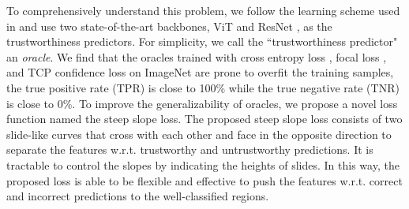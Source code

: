 
To comprehensively understand this problem, we follow the learning scheme used in \cite{Corbiere_NIPS_2019} and use two state-of-the-art backbones, \ie ViT \cite{Dosovitskiy_ICLR_2021} and ResNet \cite{He_CVPR_2016}, as the trustworthiness predictors.
For simplicity, we call the ``trustworthiness predictor" an \emph{oracle}.
We find that the oracles trained with cross entropy loss \cite{Murphy_Book_2012}, focal loss \cite{Lin_ICCV_2017}, and TCP confidence loss \cite{Corbiere_NIPS_2019} on ImageNet are prone to overfit the training samples, \ie the true positive rate (TPR) is close to 100\% while the true negative rate (TNR) is close to 0\%.
To improve the generalizability of oracles, we propose a novel loss function named the steep slope loss.
The proposed steep slope loss consists of two slide-like curves that cross with each other and face in the opposite direction to separate the features w.r.t. trustworthy and untrustworthy predictions.
It is tractable to control the slopes by indicating the heights of slides.
In this way, the proposed loss is able to be flexible and effective to push the features w.r.t. correct and incorrect predictions to the well-classified regions.



